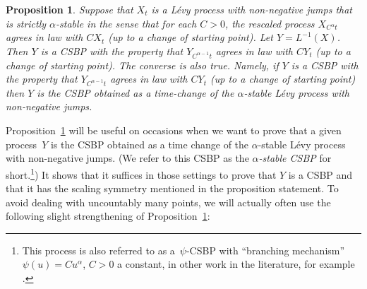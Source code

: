 \documentclass[JEP,XML,SOM,Unicode]{cedram}
\theoremstyle{plain}
\numberwithin{theorem}{section}
\newtheorem{proposition}[theorem]{Proposition}
\theoremstyle{definition}
\begin{document}
\begin{proposition}
\label{prop::stablecsbp}
Suppose that $X_t$ is a Lévy process with non-negative jumps that is strictly \emph{$\alpha$-stable} in the sense that for each $C>0$, the rescaled process $X_{C^\alpha t}$ agrees in law with $C X_t$ (up to a change of starting point). Let $Y = L^{-1}(X)$. Then $Y$ is a CSBP with the property that $Y_{C^{\alpha-1} t}$ agrees in law with $C Y_t$ (up to a change of starting point). The converse is also true. Namely, if $Y$ is a CSBP with the property that $Y_{C^{\alpha-1} t}$ agrees in law with $C Y_t$ (up to a change of starting point) then $Y$ is the CSBP obtained as a time-change of the $\alpha$-stable Lévy process with non-negative jumps.
\end{proposition}

Proposition~\ref{prop::stablecsbp} will be useful on occasions when we want to prove that a given process~$Y$ is the CSBP obtained as a time change of the $\alpha$-stable Lévy process with non-negative jumps. (We refer to this CSBP as the \emph{$\alpha$-stable CSBP} for short.\footnote{This process is also referred to as a~$\psi$-CSBP with ``branching mechanism'' $\psi(u) = C u^\alpha$, $C > 0$ a constant, in other work in the literature, for example \cite{dlg2002trees_levy}.}) It shows that it suffices in those settings to prove that $Y$ is a CSBP and that it has the scaling symmetry mentioned in the proposition statement. To avoid dealing with uncountably many points, we will actually often use the following slight strengthening of Proposition~\ref{prop::stablecsbp}:
\end{document}

